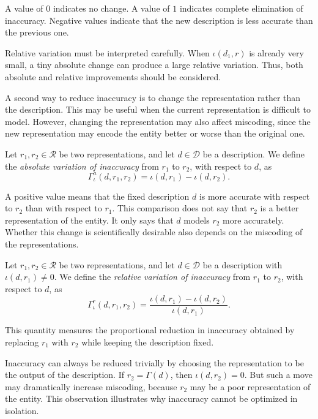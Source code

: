 A value of \(0\) indicates no change. A value of \(1\) indicates complete elimination of inaccuracy. Negative values indicate that the new description is less accurate than the previous one.

Relative variation must be interpreted carefully. When \(\iota(d_1,r)\) is already very small, a tiny absolute change can produce a large relative variation. Thus, both absolute and relative improvements should be considered.

A second way to reduce inaccuracy is to change the representation rather than the description. This may be useful when the current representation is difficult to model. However, changing the representation may also affect miscoding, since the new representation may encode the entity better or worse than the original one.

\begin{definition}
Let \(r_1,r_2 \in \mathcal{R}\) be two representations, and let \(d \in \mathcal D\) be a description. We define the \emph{absolute variation of inaccuracy} from \(r_1\) to \(r_2\), with respect to \(d\), as
\[
\Gamma_{\iota}^{a}(d,r_1,r_2)
=
\iota(d,r_1)-\iota(d,r_2).
\]
\end{definition}

A positive value means that the fixed description \(d\) is more accurate with respect to \(r_2\) than with respect to \(r_1\). This comparison does not say that \(r_2\) is a better representation of the entity. It only says that \(d\) models \(r_2\) more accurately. Whether this change is scientifically desirable also depends on the miscoding of the representations.

\begin{definition}
Let \(r_1,r_2 \in \mathcal{R}\) be two representations, and let \(d \in \mathcal D\) be a description with \(\iota(d,r_1)\neq 0\). We define the \emph{relative variation of inaccuracy} from \(r_1\) to \(r_2\), with respect to \(d\), as
\[
\Gamma_{\iota}^{r}(d,r_1,r_2)
=
\frac{\iota(d,r_1)-\iota(d,r_2)}
{\iota(d,r_1)}.
\]
\end{definition}

This quantity measures the proportional reduction in inaccuracy obtained by replacing \(r_1\) with \(r_2\) while keeping the description fixed.

Inaccuracy can always be reduced trivially by choosing the representation to be the output of the description. If \(r_2=\Gamma(d)\), then \(\iota(d,r_2)=0\). But such a move may dramatically increase miscoding, because \(r_2\) may be a poor representation of the entity. This observation illustrates why inaccuracy cannot be optimized in isolation.


